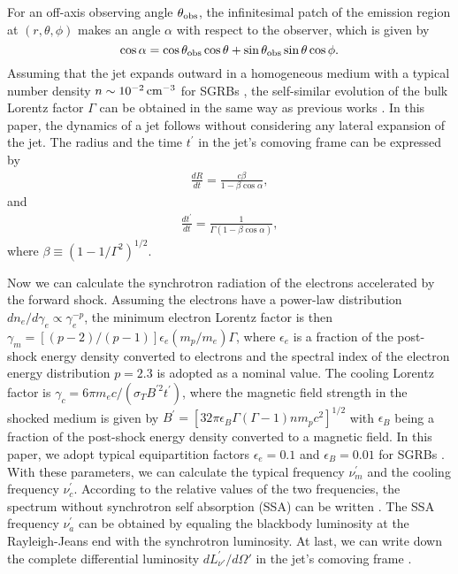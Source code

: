 \documentclass{emulateapj}
\def\beq{\begin{equation}}
\def\enq{\end{equation}}
\def\bea{\begin{eqnarray}}
\def\ena{\end{eqnarray}}
\begin{document}
For an off-axis observing angle $\theta_{\rm obs}$, the infinitesimal patch of the emission region at $(r,\theta,\phi)$ makes an angle $\alpha$ with respect to the observer, which is given by \citep{kath17}
\beq
\cos\alpha=\cos\theta_{\rm obs}\cos\theta+\sin\theta_{\rm obs}\sin\theta\cos\phi.
\label{eq:ang}
\enq
Assuming that the jet expands outward in a homogeneous medium with a typical number density $n\sim 10^{-2}\,\rm cm^{-3}$ for SGRBs \citep{fong15}, the self-similar evolution of the bulk Lorentz factor $\Gamma$ can be obtained in the same way as previous works \citep[e.g.][]{bm76, huang99, dai01}.
In this paper, the dynamics of a jet follows \cite{huang00} without considering any lateral expansion of the jet. The radius and the time $t^{\prime}$ in the jet's comoving frame can be expressed by
\bea
\frac{dR}{dt}=\frac{c\beta}{1-\beta\cos\alpha},
\ena
and
\bea
\frac{dt^{\prime}}{dt}=\frac{1}{\Gamma(1-\beta\cos\alpha)},
\label{eq:Rtcom}
\ena
where $\beta\equiv(1-1/\Gamma^2)^{1/2}$.

Now we can calculate the synchrotron radiation of the electrons accelerated by the forward shock. Assuming the electrons have a power-law distribution $dn_e/d\gamma_e\propto \gamma_e^{-p}$, the minimum electron Lorentz factor is then $\gamma_m=[(p-2)/(p-1)]\epsilon_e(m_p/m_e)\Gamma$, where $\epsilon_e$ is a fraction of the post-shock energy density converted to electrons and the spectral index of the electron energy distribution $p=2.3$ is adopted as a nominal value. The cooling Lorentz factor is $\gamma_c=6\pi m_ec/(\sigma_TB^{\prime2}t^{\prime})$, where the magnetic field strength in the shocked medium is given by $B^{\prime}=[32\pi\epsilon_B\Gamma(\Gamma-1)nm_pc^2]^{1/2}$ with $\epsilon_B$ being a fraction of the post-shock energy density converted to a magnetic field. In this paper, we adopt typical equipartition factors $\epsilon_e=0.1$ and $\epsilon_B=0.01$ for SGRBs \citep{fong15}. With these parameters, we can calculate the typical frequency $\nu_m^{\prime}$ and the cooling frequency $\nu_c^{\prime}$. According to the relative values of the two frequencies, the spectrum without synchrotron self absorption (SSA) can be written \citep{sari98}. The SSA frequency $\nu_a^{\prime}$ can be obtained by equaling the blackbody luminosity at the Rayleigh-Jeans end with the synchrotron luminosity. At last, we can write down the complete differential luminosity $dL_{\nu'}^{\prime}/d\Omega'$ in the jet's comoving frame \citep[e.g.][]{dai01, xiao17}.
\end{document}
